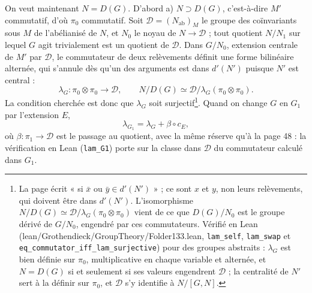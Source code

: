 \documentclass[11pt,a4paper]{article}
\begin{document}
On veut maintenant $N = D(G)$. D'abord a) $N \supset D(G)$, c'est-à-dire
$M'$ commutatif, d'où $\pi_0$ commutatif. Soit
$\mathcal{D} = (N_{\mathrm{ab}})_M$ le groupe des coïnvariants sous $M$ de
l'abélianisé de $N$, et $N_0$ le noyau de $N \to \mathcal{D}$ ; tout quotient
$N/N_1$ sur lequel $G$ agit trivialement est un quotient de $\mathcal{D}$.
Dans $G/N_0$, extension centrale de $M'$ par $\mathcal{D}$, le commutateur de
deux relèvements définit une forme bilinéaire alternée, qui s'annule dès
qu'un des arguments est dans $d'(N')$ puisque $N'$ est central :
\[
\lambda_G \colon \pi_0 \otimes \pi_0 \longrightarrow \mathcal{D},
\qquad
N/D(G) \simeq \mathcal{D}/\lambda_G(\pi_0 \otimes \pi_0) .
\]
La condition cherchée est donc que $\lambda_G$ soit
surjectif\footnote{La page écrit « si $\bar{x}$ ou $\bar{y} \in d'(N')$ » ;
ce sont $x$ et $y$, non leurs relèvements, qui doivent être dans $d'(N')$.
L'isomorphisme $N/D(G) \simeq \mathcal{D}/\lambda_G(\pi_0 \otimes \pi_0)$
vient de ce que $D(G)/N_0$ est le groupe dérivé de $G/N_0$, engendré par ces
commutateurs. Vérifié en Lean (lean/Grothendieck/GroupTheory/Folder133.lean,
\texttt{lam\_self}, \texttt{lam\_swap} et
\texttt{eq\_commutator\_iff\_lam\_surjective}) pour des groupes abstraits :
$\lambda_G$ est bien définie sur $\pi_0$, multiplicative en chaque variable et
alternée, et $N = D(G)$ si et seulement si ses valeurs engendrent
$\mathcal{D}$ ; la centralité de $N'$ sert à la définir sur $\pi_0$, et
$\mathcal{D}$ s'y identifie à $N/[G, N]$.}. Quand on change $G$ en $G_1$ par l'extension $E$,
\[
\lambda_{G_1} = \lambda_G + \beta \circ c_E,
\]
où $\beta \colon \pi_1 \to \mathcal{D}$ est le passage au quotient, avec
la même réserve qu'à la page 48 : la vérification en Lean
(\texttt{lam\_G1}) porte sur la classe dans $\mathcal{D}$ du commutateur
calculé dans $G_1$.
\end{document}
